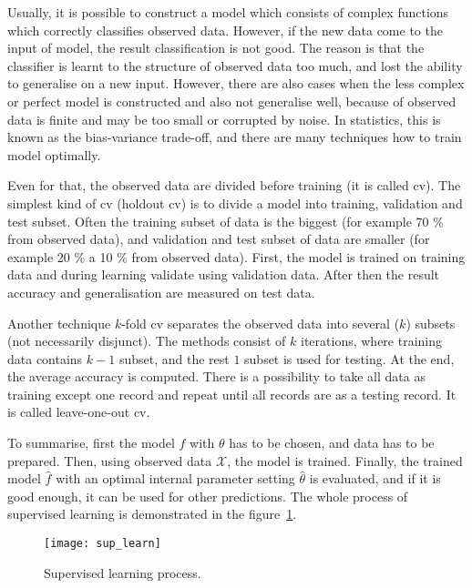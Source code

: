 \documentclass[thesis=M,english]{FITthesis}[2012/10/20]
\begin{document}
Usually, it is possible to construct a model which consists of complex functions which correctly classifies observed data. However, if the new data come to the input of model, the result classification is not good. The reason is that the classifier is learnt to the structure of observed data too much, and lost the ability to generalise on a new input. However, there are also cases when the less complex or perfect model is constructed and also not generalise well, because of observed data is finite and may be too small or corrupted by noise. In statistics, this is known as the bias-variance trade-off, and there are many techniques how to train model optimally.\cite[6]{Bradley1999datamining}

Even for that, the observed data are divided before training (it is called \gls{cv}). The simplest kind of \gls{cv} (holdout \gls{cv}) is to divide a model into training, validation and test subset\cite{Sheinder1997crossvalidation}. Often the training subset of data is the biggest (for example 70 \% from observed data), and validation and test subset of data are smaller (for example 20 \% a 10 \% from observed data). First, the model is trained on training data and during learning validate using validation data. After then the result accuracy and generalisation are measured on test data. 

Another technique $k$-fold \gls{cv} separates the observed data into several ($k$) subsets (not necessarily disjunct)\cite{Sheinder1997crossvalidation}. The methods consist of $k$ iterations, where training data contains $k-1$ subset, and the rest $1$ subset is used for testing. At the end, the average accuracy is computed. There is a possibility to take all data as training except one record and repeat until all records are as a testing record. It is called leave-one-out \gls{cv}\cite{Sheinder1997crossvalidation}. 

To summarise, first the model $f$ with $\theta$ has to be chosen, and data has to be prepared. Then, using observed data $\mathcal{X}$, the model is trained. Finally, the trained model $\hat{f}$ with an optimal internal parameter setting $\hat{\theta}$ is evaluated, and if it is good enough, it can be used for other predictions. The whole process of supervised learning is demonstrated in the figure~\ref{fig:supervised_learning}. 

\vspace*{0.5cm}

\begin{figure}[ht]\centering
    \texttt{[image: sup\_learn]}
    \caption{Supervised learning process.}\label{fig:supervised_learning}
\end{figure}
\end{document}

